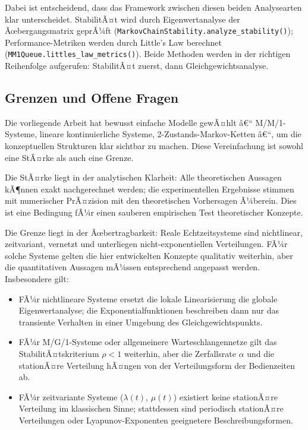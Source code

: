 ﻿\documentclass[a4paper,12pt]{report}
\theoremstyle{definition}
\begin{document}
Dabei ist entscheidend, dass das Framework zwischen diesen beiden Analysearten
klar unterscheidet.  StabilitÃ¤t wird durch Eigenwertanalyse der
Ãœbergangsmatrix geprÃ¼ft (\texttt{MarkovChainStability.analyze\_stability()});
Performance-Metriken werden durch Little's Law berechnet
(\texttt{MM1Queue.littles\_law\_metrics()}).  Beide Methoden werden in der
richtigen Reihenfolge aufgerufen: StabilitÃ¤t zuerst, dann
Gleichgewichtsanalyse.

\subsection{Grenzen und Offene Fragen}

Die vorliegende Arbeit hat bewusst einfache Modelle gewÃ¤hlt â€“ M/M/1-Systeme,
lineare kontinuierliche Systeme, 2-Zustands-Markov-Ketten â€“, um die
konzeptuellen Strukturen klar sichtbar zu machen.  Diese Vereinfachung ist
sowohl eine StÃ¤rke als auch eine Grenze.

Die StÃ¤rke liegt in der analytischen Klarheit: Alle theoretischen Aussagen
kÃ¶nnen exakt nachgerechnet werden; die experimentellen Ergebnisse stimmen
mit numerischer PrÃ¤zision mit den theoretischen Vorhersagen Ã¼berein.  Dies
ist eine Bedingung fÃ¼r einen sauberen empirischen Test theoretischer
Konzepte.

Die Grenze liegt in der Ãœbertragbarkeit: Reale Echtzeitsysteme sind
nichtlinear, zeitvariant, vernetzt und unterliegen nicht-exponentiellen
Verteilungen.  FÃ¼r solche Systeme gelten die hier entwickelten Konzepte
qualitativ weiterhin, aber die quantitativen Aussagen mÃ¼ssen entsprechend
angepasst werden.  Insbesondere gilt:
\begin{itemize}
	\item[-] FÃ¼r nichtlineare Systeme ersetzt die lokale Linearisierung die
	globale Eigenwertanalyse; die Exponentialfunktionen beschreiben
	dann nur das transiente Verhalten in einer Umgebung des
	Gleichgewichtspunkts.
	\item[-] FÃ¼r M/G/1-Systeme oder allgemeinere Warteschlangennetze
	gilt das StabilitÃ¤tskriterium $\rho < 1$ weiterhin, aber die
	Zerfallsrate $\alpha$ und die stationÃ¤re Verteilung hÃ¤ngen von
	der Verteilungsform der Bedienzeiten ab.
	\item[-] FÃ¼r zeitvariante Systeme ($\lambda(t)$, $\mu(t)$) existiert
	keine stationÃ¤re Verteilung im klassischen Sinne; stattdessen
	sind periodisch stationÃ¤re Verteilungen oder
	Lyapunov-Exponenten geeignetere Beschreibungsformen.
\end{itemize}
\end{document}
